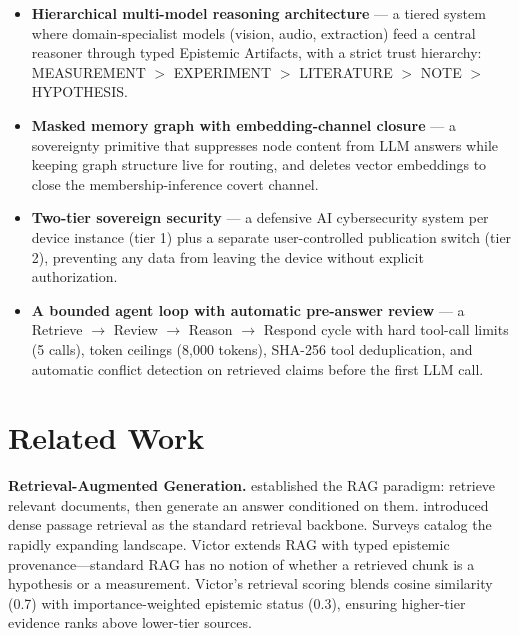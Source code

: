 \documentclass[letterpaper]{article}          %
\theoremstyle{plain}
\theoremstyle{definition}
\theoremstyle{remark}
\begin{document}
\begin{itemize}
    \item \textbf{Hierarchical multi-model reasoning architecture} --- a tiered
    system where domain-specialist models (vision, audio, extraction) feed a
    central reasoner through typed Epistemic Artifacts, with a strict trust
    hierarchy: MEASUREMENT $>$ EXPERIMENT $>$ LITERATURE $>$ NOTE $>$ HYPOTHESIS.
    \item \textbf{Masked memory graph with embedding-channel closure} --- a
    sovereignty primitive that suppresses node content from LLM answers while
    keeping graph structure live for routing, and deletes vector embeddings to
    close the membership-inference covert channel.
    \item \textbf{Two-tier sovereign security} --- a defensive AI cybersecurity
    system per device instance (tier 1) plus a separate user-controlled
    publication switch (tier 2), preventing any data from leaving the device
    without explicit authorization.
    \item \textbf{A bounded agent loop with automatic pre-answer review} --- a
    Retrieve $\rightarrow$ Review $\rightarrow$ Reason $\rightarrow$ Respond
    cycle with hard tool-call limits (5 calls), token ceilings (8,000 tokens),
    SHA-256 tool deduplication, and automatic conflict detection on retrieved
    claims before the first LLM call.
\end{itemize}


\section{Related Work}

\textbf{Retrieval-Augmented Generation.} \citet{lewis2020rag} established the
RAG paradigm: retrieve relevant documents, then generate an answer conditioned
on them. \citet{karpukhin2020dpr} introduced dense passage retrieval as the
standard retrieval backbone. Surveys \citep{gao2024ragsurvey} catalog the
rapidly expanding landscape. Victor extends RAG with typed epistemic
provenance---standard RAG has no notion of whether a retrieved chunk is a
hypothesis or a measurement. Victor's retrieval scoring blends cosine similarity
(0.7) with importance-weighted epistemic status (0.3), ensuring higher-tier
evidence ranks above lower-tier sources.
\end{document}
